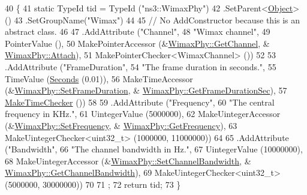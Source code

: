 \begin{DoxyCode}
40 \{
41   \textcolor{keyword}{static} TypeId tid = TypeId (\textcolor{stringliteral}{"ns3::WimaxPhy"})
42     .SetParent<\hyperlink{classns3_1_1Object_a40860402e64d8008fb42329df7097cdb}{Object}> ()
43     .SetGroupName(\textcolor{stringliteral}{"Wimax"})
44 
45     \textcolor{comment}{// No AddConstructor because this is an abstract class.}
46 
47     .AddAttribute (\textcolor{stringliteral}{"Channel"},
48                    \textcolor{stringliteral}{"Wimax channel"},
49                    PointerValue (),
50                    MakePointerAccessor (&\hyperlink{classns3_1_1WimaxPhy_a178bf19461a73be0251443af2204e0ac}{WimaxPhy::GetChannel}, &
      \hyperlink{classns3_1_1WimaxPhy_a3adfde80658dbb7dce265343f9232803}{WimaxPhy::Attach}),
51                    MakePointerChecker<WimaxChannel> ())
52 
53     .AddAttribute (\textcolor{stringliteral}{"FrameDuration"},
54                    \textcolor{stringliteral}{"The frame duration in seconds."},
55                    TimeValue (\hyperlink{group__timecivil_ga33c34b816f8ff6628e33d5c8e9713b9e}{Seconds} (0.01)),
56                    MakeTimeAccessor (&\hyperlink{classns3_1_1WimaxPhy_aa834d7cca63f605f92a6bd059fb2b8e7}{WimaxPhy::SetFrameDuration}, &
      \hyperlink{classns3_1_1WimaxPhy_a6a427cbe9927463b71d1f65d8f136785}{WimaxPhy::GetFrameDurationSec}),
57                    \hyperlink{group__time_ga7032965bd4afa578691d88c09e4481c1}{MakeTimeChecker} ())
58 
59     .AddAttribute (\textcolor{stringliteral}{"Frequency"},
60                    \textcolor{stringliteral}{"The central frequency in KHz."},
61                    UintegerValue (5000000),
62                    MakeUintegerAccessor (&\hyperlink{classns3_1_1WimaxPhy_a4707c4d4489ac404aa1397df3b2e88af}{WimaxPhy::SetFrequency}, &
      \hyperlink{classns3_1_1WimaxPhy_a43dc17d09c864a9f752286bb11df13d8}{WimaxPhy::GetFrequency}),
63                    MakeUintegerChecker<uint32\_t> (1000000, 11000000))
64 
65     .AddAttribute (\textcolor{stringliteral}{"Bandwidth"},
66                    \textcolor{stringliteral}{"The channel bandwidth in Hz."},
67                    UintegerValue (10000000),
68                    MakeUintegerAccessor (&\hyperlink{classns3_1_1WimaxPhy_a1410ed7a966d0d066a1dd8f016edd444}{WimaxPhy::SetChannelBandwidth}, &
      \hyperlink{classns3_1_1WimaxPhy_a701650940d220ad625c30a08c06e85e5}{WimaxPhy::GetChannelBandwidth}),
69                    MakeUintegerChecker<uint32\_t> (5000000, 30000000))
70 
71   ;
72   \textcolor{keywordflow}{return} tid;
73 \}
\end{DoxyCode}


